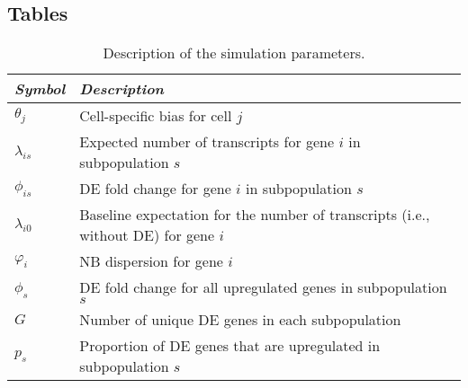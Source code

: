 \documentclass{bmcart}
\newcommand{\revised}[1]{#1}
\begin{document}
\begin{backmatter}

\section*{Tables}

\begin{table}[!h]
\caption{
    Description of the simulation parameters.
}
\begin{center}
\begin{tabular}{l l}
    \hline
\textit{Symbol} & \textit{Description} \\   
    \hline
    $\theta_j$ &  Cell-specific bias for cell $j$ \\
    $\lambda_{is}$ & Expected number of transcripts for gene $i$ in subpopulation $s$ \\
    $\phi_{is}$ & DE fold change for gene $i$ in subpopulation $s$ \\
    $\lambda_{i0}$ & Baseline expectation for the number of transcripts (i.e., without DE) for gene $i$ \\
    $\varphi_i$ & NB dispersion for gene $i$ \\
    $\phi_{s}$ & DE fold change for all \revised{upregulated} genes in subpopulation $s$ \\
    $G$ & Number of unique DE genes in each subpopulation \\
    $p_s$ & Proportion of DE genes that are upregulated in subpopulation $s$ \\
    \hline
\end{tabular}
\end{center}
\label{tab:sim_param}
\end{table}


\end{backmatter}
\end{document}
